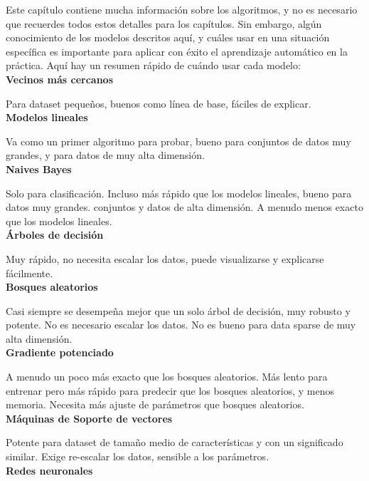 {Este capítulo contiene mucha información sobre los algoritmos, y no es necesario que recuerdes todos estos detalles para los capítulos.  Sin embargo, algún conocimiento de los modelos descritos aquí, y cuáles usar en una situación específica es importante para aplicar con éxito el aprendizaje automático en la práctica. Aquí hay un resumen rápido de cuándo usar cada modelo:\\



{\bf Vecinos más cercanos }

Para dataset pequeños, buenos como línea de base, fáciles de explicar.\\

{\bf Modelos lineales}

Va  como un primer algoritmo para probar, bueno para conjuntos de datos muy grandes,  y para datos de muy alta dimensión.\\


{\bf Naives Bayes}

 Solo para clasificación. Incluso más rápido que los modelos lineales, bueno para datos muy grandes.
conjuntos y datos de alta dimensión. A menudo menos exacto que los modelos lineales.\\


{ \bf Árboles de decisión}

Muy rápido, no necesita escalar los datos, puede visualizarse y explicarse fácilmente.\\

{\bf Bosques aleatorios}

Casi siempre se desempeña mejor que un solo árbol de decisión, muy robusto y potente. No es necesario escalar los datos. No es bueno para data sparse de muy alta dimensión.\\


{\bf Gradiente potenciado}

A menudo un poco más exacto  que los bosques aleatorios. Más lento para entrenar pero más rápido para
predecir que los bosques aleatorios, y menos  memoria. Necesita más ajuste de parámetros
 que bosques aleatorios.\\
 
{\bf Máquinas de Soporte de vectores}

Potente para  dataset de tamaño medio de características  y  con un significado similar. Exige
re-escalar los datos, sensible a los parámetros.\\

{\bf Redes neuronales}

}
